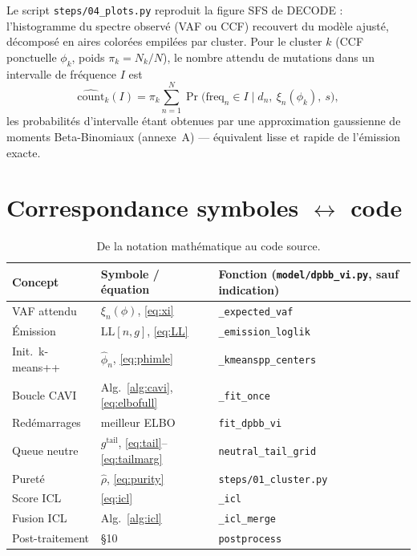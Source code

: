 \documentclass[11pt,a4paper]{article}
\newcommand{\code}[1]{\texttt{#1}}
\theoremstyle{remark}
\begin{document}
Le script \code{steps/04\_plots.py} reproduit la figure SFS de DECODE : l'histogramme du
spectre observé (VAF ou CCF) recouvert du modèle ajusté, décomposé en aires colorées
empilées par cluster. Pour le cluster $k$ (CCF ponctuelle $\phi_k$, poids
$\pi_k=N_k/N$), le nombre attendu de mutations dans un intervalle de fréquence $I$ est
\[
\widehat{\text{count}}_k(I)=\pi_k\sum_{n=1}^{N} \Pr\!\big(\text{freq}_n\in I \mid d_n,\ \xi_n(\phi_k),\ s\big),
\]
les probabilités d'intervalle étant obtenues par une approximation gaussienne de moments
Beta-Binomiaux (annexe~A) --- équivalent lisse et rapide de l'émission exacte.

\section{Correspondance symboles $\leftrightarrow$ code}

\begin{table}[h]
\centering
\small
\begin{tabular}{@{}lll@{}}
\toprule
Concept & Symbole / équation & Fonction (\code{model/dpbb\_vi.py}, sauf indication) \\
\midrule
VAF attendu          & $\xi_n(\phi)$, \eqref{eq:xi}          & \code{\_expected\_vaf} \\
Émission             & $\mathrm{LL}[n,g]$, \eqref{eq:LL}     & \code{\_emission\_loglik} \\
Init.\ k-means++     & $\hat\phi_n$, \eqref{eq:phimle}       & \code{\_kmeanspp\_centers} \\
Boucle CAVI          & Alg.~\ref{alg:cavi}, \eqref{eq:elbofull} & \code{\_fit\_once} \\
Redémarrages         & meilleur ELBO                         & \code{fit\_dpbb\_vi} \\
Queue neutre         & $g^{\mathrm{tail}}$, \eqref{eq:tail}--\eqref{eq:tailmarg} & \code{neutral\_tail\_grid} \\
Pureté               & $\hat\rho$, \eqref{eq:purity}         & \code{steps/01\_cluster.py} \\
Score ICL            & \eqref{eq:icl}                        & \code{\_icl} \\
Fusion ICL           & Alg.~\ref{alg:icl}                    & \code{\_icl\_merge} \\
Post-traitement      & \S 10                                 & \code{postprocess} \\
\bottomrule
\end{tabular}
\caption{De la notation mathématique au code source.}
\label{tab:code}
\end{table}
\end{document}
